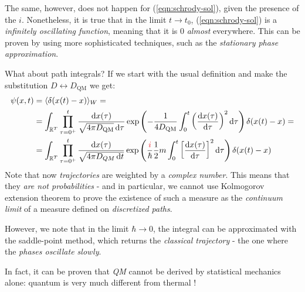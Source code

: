 \documentclass[../template.tex]{subfiles}
\begin{document}
The same, however, does not happen for (\ref{eqn:schrody-sol}), given the presence of the $i$. Nonetheless, it is true that in the limit $t \to t_0$, (\ref{eqn:schrody-sol}) is a \textit{infinitely oscillating function}, meaning that it is $0$ \textit{almost} everywhere. This can be proven by using more sophisticated techniques, such as the \textit{stationary phase approximation}. 

\medskip

What about path integrals? If we start with the usual definition and make the substitution $D \leftrightarrow D_{\mathrm{QM}}$ we get:
\begin{align*}
    \psi(x,t) &= \langle \delta(x(t) - x) \rangle_W =\\
    &= \int_{\mathbb{R}^T} \prod_{\tau = 0^+}^t \frac{\dd{x(\tau)}}{\sqrt{4 \pi D_\mathrm{QM}} \dd{\tau}} \exp\left(-\frac{1}{4 D_{\mathrm{QM}}} \int_0^t \left(\dv{x(\tau)}{\tau}\right)^2 \dd{\tau} \right) \delta(x(t)-x) =\\
&= \int_{\mathbb{R}^T} \prod_{\tau = 0^+}^t \frac{\dd{x(\tau)}}{\sqrt{4 \pi D_{QM} \dd{t}}} \exp\left(\frac{\textcolor{Red}{i}}{\hbar} \frac{1}{2}m \int_0^t \left[\dv{x(\tau)}{\tau}\right]^2 \dd{\tau} \right) \delta(x(t)-x)
\end{align*}
Note that now \textit{trajectories} are weighted by a \textit{complex number}. This means that they \textit{are not probabilities} - and in particular, we cannot use Kolmogorov extension theorem to prove the existence of such a measure as the \textit{continuum limit} of a measure defined on \textit{discretized paths}.

However, we note that in the limit $\hbar \to 0$, the integral can be approximated with the saddle-point method, which returns the \textit{classical trajectory} - the one where the \textit{phases oscillate slowly}.

In fact, it can be proven that \textit{QM} cannot be derived by statistical mechanics alone: quantum  is very much different from thermal !

\medskip
\end{document}
